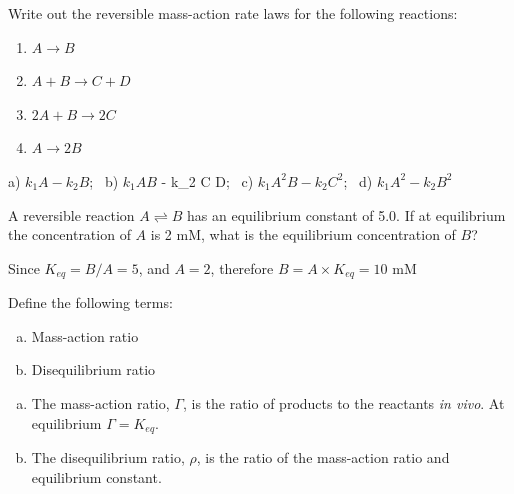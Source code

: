 \documentclass[12pt]{article}
\begin{document}
\begin{question}
Write out the reversible mass-action rate laws for the following reactions:
\begin{enumerate}
  \item $ A \rightarrow B $
  \item $ A + B \rightarrow C + D $
  \item $2 A + B \rightarrow 2 C $
  \item $A \rightarrow 2 B $
\end{enumerate}
\end{question}

\begin{solution}
a) $k_1 A - k_2 B$; \ b) $k_1 A B$ - k_2 C D; \ c) $k_1 A^2 B - k_2 C^2$; \ d) $k_1 A^2 - k_2 B^2$
\end{solution}

\begin{question}
A reversible reaction $A \rightleftharpoons B$ has an equilibrium constant of 5.0. If at equilibrium the concentration of $A$ is 2 mM, what is the equilibrium concentration of $B$?
\end{question}

\begin{solution}
Since $K_{eq} = B/A = 5$, and $A = 2$, therefore $B = A \times K_{eq} = 10$ mM
\end{solution}


\begin{question}
Define the following terms:

\begin{enumerate}[a)]
  \item Mass-action ratio
  \item Disequilibrium ratio
\end{enumerate}
\end{question}

\begin{solution}
\begin{enumerate}[a)]
\item The mass-action ratio, $\Gamma$, is the ratio of products to the reactants {\em in vivo}. At equilibrium $\Gamma = K_{eq}$.
\item The disequilibrium ratio, $\rho$, is the ratio of the mass-action ratio and equilibrium constant.
\end{enumerate}
\end{solution}

\end{document}
